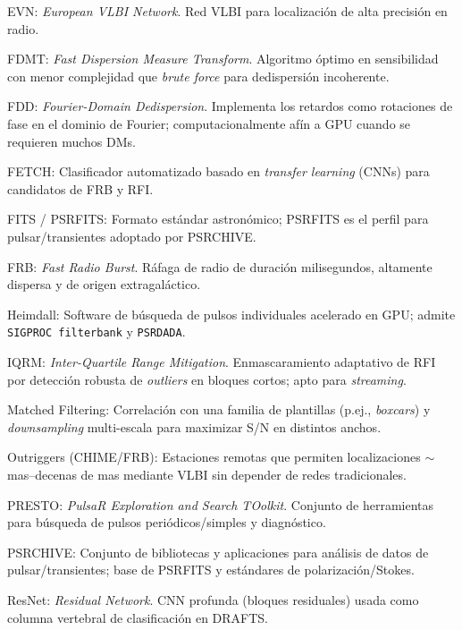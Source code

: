 {EVN: \textit{European VLBI Network}. Red VLBI para localización de alta precisión en radio.

FDMT: \textit{Fast Dispersion Measure Transform}. Algoritmo óptimo en sensibilidad con menor complejidad que \textit{brute force} para dedispersión incoherente. \citep{Zackay_2014_FDMT}

FDD: \textit{Fourier-Domain Dedispersion}. Implementa los retardos como rotaciones de fase en el dominio de Fourier; computacionalmente afín a GPU cuando se requieren muchos DMs. \citep{Bassa_2021_FDD}

FETCH: Clasificador automatizado basado en \textit{transfer learning} (CNNs) para candidatos de FRB y RFI. \citep{Agarwal_2020}

FITS / PSRFITS: Formato estándar astronómico; PSRFITS es el perfil para pulsar/transientes adoptado por \textsc{PSRCHIVE}. \citep{Hotan_2004_PSRFITS}

FRB: \textit{Fast Radio Burst}. Ráfaga de radio de duración milisegundos, altamente dispersa y de origen extragaláctico. \citep{Petroff_2022,Zhang_2020}

Heimdall: Software de búsqueda de pulsos individuales acelerado en GPU; admite \texttt{SIGPROC filterbank} y \texttt{PSRDADA}. \citep{Heimdall_Use}

IQRM: \textit{Inter-Quartile Range Mitigation}. Enmascaramiento adaptativo de RFI por detección robusta de \textit{outliers} en bloques cortos; apto para \textit{streaming}. \citep{Morello_2021_IQRM}

Matched Filtering: Correlación con una familia de plantillas (p.ej., \textit{boxcars}) y \textit{downsampling} multi-escala para maximizar S/N en distintos anchos. \citep{Rajwade_2024_Review}

Outriggers (CHIME/FRB): Estaciones remotas que permiten localizaciones $\sim$mas–decenas de mas mediante VLBI sin depender de redes tradicionales. \citep{Lanman_2024_Outrigger,CHIME_Outriggers_Overview}

PRESTO: \textit{PulsaR Exploration and Search TOolkit}. Conjunto de herramientas para búsqueda de pulsos periódicos/simples y diagnóstico. \citep{2011ascl.soft07017R}

PSRCHIVE: Conjunto de bibliotecas y aplicaciones para análisis de datos de pulsar/transientes; base de PSRFITS y estándares de polarización/Stokes. \citep{Hotan_2004_PSRFITS}

ResNet: \textit{Residual Network}. CNN profunda (bloques residuales) usada como columna vertebral de clasificación en DRAFTS. \citep{He_2015_ResNet}

}
